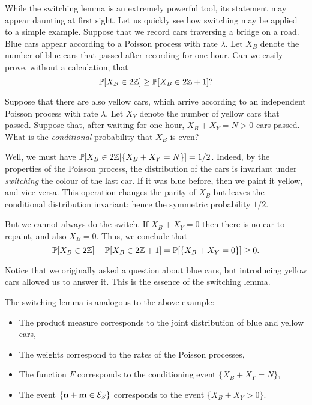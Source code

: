 \begin{remark}
    While the switching lemma is an extremely powerful tool,
    its statement may appear daunting at first sight.
    Let us quickly see how switching may be applied to a simple example.
    Suppose that we record cars traversing a bridge on a road.
    Blue cars appear according to a Poisson process with rate $\lambda$.
    Let $X_B$ denote the number of blue cars that passed after recording for one hour.
    Can we easily prove, without a calculation, that
    \[
        \mathbb P[X_B\in 2\mathbb Z]\geq \mathbb P[X_B\in 2\mathbb Z+1]?
    \]

    Suppose that there are also yellow cars,
    which arrive according to an independent Poisson process with rate $\lambda$.
    Let $X_Y$ denote the number of yellow cars that passed.
    Suppose that, after waiting for one hour, $X_B+X_Y=N>0$ cars passed.
    What is the \emph{conditional} probability that $X_B$ is even?

    Well, we must have $\mathbb P[X_B\in2\mathbb Z|\{X_B+X_Y=N\}]=1/2$. Indeed, by the properties of the Poisson process,
    the distribution of the cars is invariant under \emph{switching} the colour
    of the last car. If it was blue before, then we paint it yellow,
    and vice versa.
    This operation changes the parity of $X_B$
    but leaves the conditional distribution invariant: 
    hence the symmetric probability $1/2$.

    But we cannot always do the switch.
    If $X_B+X_Y=0$
    then there is no car to repaint, and also
    $X_B=0$.
    Thus, we conclude that
    \[
        \mathbb P[X_B\in 2\mathbb Z]-\mathbb P[X_B\in 2\mathbb Z+1]=\mathbb P[\{X_B+X_Y=0\}]\geq 0.
    \]
    
    Notice that we originally asked a question about blue cars,
    but introducing yellow cars allowed us to answer it.
    This is the essence of the switching lemma.

    The switching lemma is analogous to the above example:
    \begin{itemize}
        \item The product measure corresponds to the joint distribution of blue and yellow cars,
        \item The weights correspond to the rates of the Poisson processes,
        \item The function $F$ corresponds to the conditioning event $\{X_B+X_Y=N\}$,
        \item The event $\{\mathbf{n}+\mathbf{m}\in\mathcal E_S\}$ corresponds to the event $\{X_B+X_Y>0\}$.
    \end{itemize}
\end{remark}

